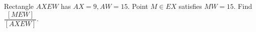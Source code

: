 Rectangle $AXEW$ has $AX=9,AW=15$. Point $M\in EX$ satisfies $MW=15$. Find $\dfrac{[MEW]}{[AXEW]}$.
